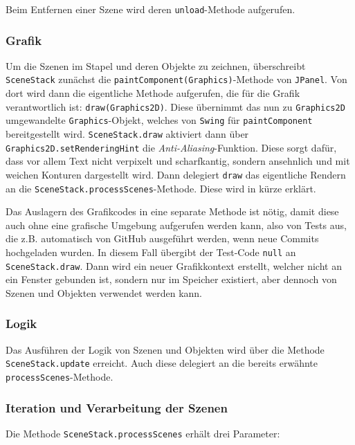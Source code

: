 \begin{sloppypar}
Beim Entfernen einer Szene wird deren \texttt{unload}-Methode aufgerufen.


\subsubsection{Grafik}

Um die Szenen im Stapel und deren Objekte zu zeichnen, überschreibt
\texttt{SceneStack} zunächst die \texttt{paintComponent(Graphics)}-Methode
von \texttt{JPanel}. Von dort wird dann die eigentliche Methode aufgerufen,
die für die Grafik verantwortlich ist: \texttt{draw(Graphics2D)}. Diese
übernimmt das nun zu \texttt{Graphics2D} umgewandelte \texttt{Graphics}-Objekt,
welches von \texttt{Swing} für \texttt{paintComponent} bereitgestellt wird.
\texttt{SceneStack.draw} aktiviert dann über \texttt{Graphics2D.setRenderingHint}
die \textit{Anti-Aliasing}-Funktion. Diese sorgt dafür, dass vor allem Text
nicht verpixelt und scharfkantig, sondern ansehnlich und mit weichen
Konturen dargestellt wird. Dann delegiert \texttt{draw} das eigentliche
Rendern an die \texttt{SceneStack.processScenes}-Methode. Diese wird
in kürze erklärt.

Das Auslagern des Grafikcodes in eine separate Methode ist nötig, damit
diese auch ohne eine grafische Umgebung aufgerufen werden kann, also von
Tests aus, die z.B. automatisch von GitHub ausgeführt werden, wenn neue
Commits hochgeladen wurden. In diesem Fall übergibt der Test-Code \texttt{null}
an \texttt{SceneStack.draw}. Dann wird ein neuer Grafikkontext erstellt,
welcher nicht an ein Fenster gebunden ist, sondern nur im Speicher existiert,
aber dennoch von Szenen und Objekten verwendet werden kann.


\subsubsection{Logik}

Das Ausführen der Logik von Szenen und Objekten wird
über die Methode \texttt{SceneStack.update} erreicht.
Auch diese delegiert an die bereits erwähnte
 \texttt{processScenes}-Methode.


\subsubsection{Iteration und Verarbeitung der Szenen}

Die Methode \texttt{SceneStack.processScenes} erhält drei Parameter:


\end{sloppypar}

